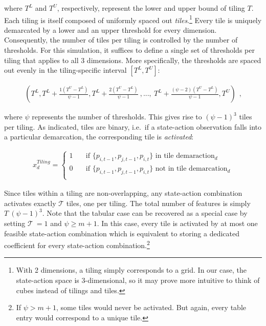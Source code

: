 where $T^L$ and $T^U$, respectively, represent the lower and upper bound of tiling $T$. Each tiling is itself composed of uniformly spaced out \emph{tiles}.\footnote{With 2 dimensions, a tiling simply corresponds to a grid. In our case, the state-action space is 3-dimensional, so it may prove more intuitive to think of cubes instead of tilings and tiles.} Every tile is uniquely demarcated by a lower and an upper threshold for every dimension. Consequently, the number of tiles per tiling is controlled by the number of thresholds. For this simulation, it suffices to define a single set of thresholds per tiling that applies to all 3 dimensions. More specifically, the thresholds are spaced out evenly in the tiling-specific interval $[T^L, T^U]$:

\begin{gather}
(
T^L,
T^L + \frac{1(T^U - T^L)}{\psi - 1},
T^L + \frac{2(T^U - T^L)}{\psi - 1}~ , ... , ~
T^L + \frac{(\psi-2)(T^U - T^L)}{\psi - 1},
T^U) ~~ \text{,}
\end{gather}

where $\psi$ represents the number of thresholds. This gives rise to $(\psi-1)^3$ tiles per tiling. As indicated, tiles are binary, i.e.\ if a state-action observation falls into a particular demarcation, the corresponding tile is \emph{activated}:

\begin{gather}\label{tile_activation}
x_d^{Tiling} = \begin{cases}
1 & \quad \text{if } \{p_{i, t-1}, p_{j, t-1}, p_{i, t}\} \text{~in tile demaraction}_d  \\
0 & \quad \text{if } \{p_{i, t-1}, p_{j, t-1}, p_{i, t}\} \text{~not in tile demarcation}_d \\ \end{cases} 
\end{gather}

Since tiles within a tiling are non-overlapping, any state-action combination activates exactly $\mathcal{T}$ tiles, one per tiling. The total number of features is simply $T~(\psi - 1)^3$. Note that the tabular case can be recovered as a special case by setting $\mathcal{T}~ = 1$ and $\psi \geq m + 1$. In this case, every tile is activated by at most one feasible state-action combination which is equivalent to storing a dedicated coefficient for every state-action combination.\footnote{If $\psi > m + 1$, some tiles would never be activated. But again, every table entry would correspond to a unique tile.}


